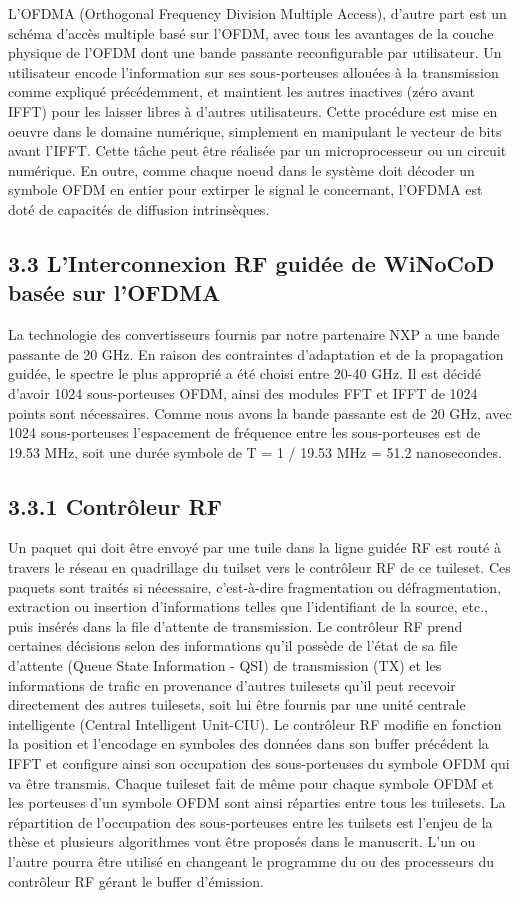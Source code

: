 L’OFDMA (Orthogonal Frequency Division Multiple Access), d'autre part est un schéma d'accès multiple basé sur l’OFDM, avec tous les avantages de la couche physique de l'OFDM dont une bande passante reconfigurable par utilisateur. Un utilisateur encode l'information sur ses sous-porteuses allouées à la transmission comme expliqué précédemment, et maintient les autres inactives (zéro avant IFFT) pour les laisser libres à d'autres utilisateurs. Cette procédure est mise en oeuvre dans le domaine numérique, simplement en manipulant le vecteur de bits avant l'IFFT. Cette tâche peut être réalisée par un microprocesseur ou un circuit numérique. En outre, comme chaque noeud dans le système doit décoder un symbole OFDM en entier pour extirper le signal le concernant, l’OFDMA est doté de capacités de diffusion intrinsèques.

\subsection*{3.3 L'Interconnexion RF guidée de WiNoCoD basée sur l’OFDMA}

La technologie des convertisseurs fournis par notre partenaire NXP a une bande passante de 20 GHz. En raison des contraintes d’adaptation et de la propagation guidée, le spectre le plus approprié a été choisi entre 20-40 GHz. Il est décidé d’avoir 1024 sous-porteuses OFDM, ainsi des modules FFT et IFFT de 1024 points sont nécessaires. Comme nous avons la bande passante est de 20 GHz, avec 1024 sous-porteuses l’espacement de fréquence entre les sous-porteuses est de 19.53 MHz, soit une durée symbole de T = 1 / 19.53 MHz = 51.2 nanosecondes.  

\subsection*{3.3.1 Contrôleur RF}

Un paquet qui doit être envoyé par une tuile dans la ligne guidée RF est routé à travers le réseau en quadrillage du tuilset vers le contrôleur RF de ce tuileset. Ces paquets sont traités si nécessaire, c’est-à-dire fragmentation ou défragmentation, extraction ou insertion d’informations telles que l’identifiant de la source, etc., puis insérés dans la file d'attente de transmission. Le contrôleur RF prend certaines décisions selon des informations qu’il possède de l'état de sa file d'attente (Queue State Information - QSI) de transmission (TX) et les informations de trafic en provenance d'autres tuilesets qu’il peut recevoir directement des autres tuilesets, soit lui être fournis par une unité centrale intelligente (Central Intelligent Unit-CIU). Le contrôleur RF modifie en fonction la position et l’encodage en symboles des données dans son buffer précédent la IFFT et configure ainsi son occupation des sous-porteuses du symbole OFDM qui va être transmis. Chaque tuileset fait de même pour chaque symbole OFDM et les porteuses d’un symbole OFDM sont ainsi réparties entre tous les tuilesets. La répartition de l’occupation des sous-porteuses entre les tuilsets est l’enjeu de la thèse et plusieurs algorithmes vont être proposés dans le manuscrit. L’un ou l’autre pourra être utilisé en changeant le programme du ou des processeurs du contrôleur RF gérant le buffer d’émission.


